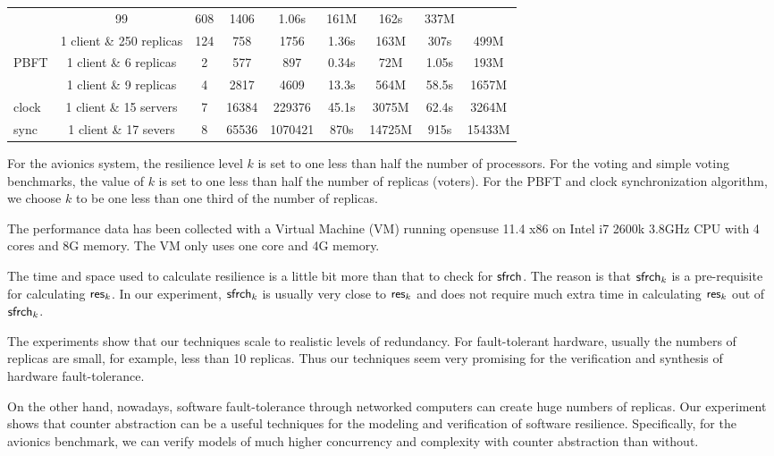 \begin{table*}[t]
\begin{center}
{\begin{tabular}{l|c|c|c|c||c|c||c|c}
	 & 99 & 608 & 1406 & 1.06s & 161M & 162s & 337M \\ \cline{2-9} 
	 & 1 client \& 250 replicas 
	 & 124 & 758 & 1756 & 1.36s & 163M & 307s & 499M \\ \hline 
PBFT 	 & 1 client \& 6 replicas 
	 & 2 & 577 & 897 & 0.34s & 72M & 1.05s & 193M \\ \cline{2-9} 
	 & 1 client \& 9 replicas 
	 & 4 & 2817 & 4609 & 13.3s & 564M & 58.5s & 1657M \\ \hline 
clock	 & 1 client \& 15 servers  
	 & 7 & 16384 & 229376 & 45.1s & 3075M & 62.4s & 3264M  \\ \cline{2-9} 
sync	 & 1 client \& 17 severs  
	 & 8 & 65536 & 1070421 & 870s & 14725M & 915s & 15433M  \\ \hline 
\end{tabular}
}
\end{center}
\vspace*{-5mm}
\end{table*}
For the avionics system, %
the resilience level $k$ is set to 
one less than half the %
number of processors.  
For the voting and simple voting benchmarks, 
the value of $k$ is set to one less than half the number of 
replicas (voters). 
For the PBFT and clock synchronization algorithm, we choose 
$k$ to be one less than one third of the number of replicas. 

The performance data has been collected with a Virtual Machine (VM) 
running opensuse 11.4 x86 
on Intel i7 2600k 3.8GHz CPU 
with 4 cores and 8G memory. 
The VM only uses one core and 4G memory.  

The time and space used to calculate resilience is a little bit more 
than that to check for $\mathsf{sfrch}$.  
The reason is that $\mathsf{sfrch}_k$ is a pre-requisite for calculating $\mathsf{res}_k$.  
In our experiment, $\mathsf{sfrch}_k$ is usually 
very close to $\mathsf{res}_k$ and does not require much extra time in 
calculating $\mathsf{res}_k$ out of $\mathsf{sfrch}_k$.  

The experiments show that our techniques 
scale to realistic levels of redundancy.  
For fault-tolerant hardware, usually the numbers of replicas are small, 
for example, less than 10 replicas. 
Thus our techniques seem very promising for the 
verification and synthesis\label{reply2.verification.hardware} of hardware fault-tolerance.  

On the other hand, 
nowadays, software fault-tolerance through networked computers can 
create huge numbers of replicas.  
Our experiment shows that counter abstraction can be a useful 
techniques for the modeling and verification of software resilience.  
Specifically, for the avionics benchmark, 
we can verify models of much higher concurrency and complexity with 
counter abstraction than without. 


